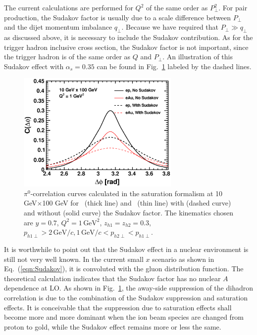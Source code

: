 The current calculations are performed for $Q^2$ of the same order as
$P^2_{\perp}$. For pair production, the Sudakov factor is usually due to
a scale difference between $P_{\perp}$ and the dijet momentum imbalance $q_{\perp}$.
Because we have required that $P_{\perp}\gg q_{\perp}$ as discussed above, it is
necessary to include the Sudakov contribution.  As for the trigger hadron
inclusive cross section, the Sudakov factor is not important, since the trigger
hadron \pt is of the same order as $Q$ and $P_\perp$. An illustration of
this Sudakov effect with $\alpha_s=0.35$ can be found in
Fig.~\ref{fig:dihadron_theory_sud} labeled by the dashed lines.
\begin{figure}
\centering
\includegraphics[width=0.7\textwidth]{plots/chpt6/theory_10x100_y_0.7_deltaphi_Sud_as_0.35.eps} 
\caption[theory prediction of dihadron correlation with Sudakov] {
$\pi^0$-correlation curves calculated in the saturation formalism at 10
GeV$\times $100 GeV for \ep\ (thick line) and \eAu\ (thin line) with (dashed
curve) and without (solid curve) the Sudakov factor. The kinematics chosen are
$y=0.7$, $Q^2=1 \, \textrm{GeV}^2$, $z_{h1}=z_{h2}=0.3$, $p_{h1\perp}>2 \,
\mathrm{GeV}/c,1 \, \mathrm{GeV}/c<p_{h2\perp}<p_{h1\perp}$.
\label{fig:dihadron_theory_sud}
}    
\end{figure}
It is worthwhile to point out that the Sudakov effect in a nuclear environment
is still not very well known. In the current small $x$ scenario as shown in
Eq.~(\ref{eqn:Sudakov}), it is convoluted with the gluon distribution function.
The theoretical calculation indicates that the Sudakov factor has no nuclear
$A$ dependence at LO. As shown in Fig.~\ref{fig:dihadron_theory_sud}, the away-side 
suppression of the dihadron correlation is due to the combination of the
Sudakov suppression and saturation effects. It is conceivable that the
suppression due to saturation effects shall become more and more dominant when
the ion beam species are changed from proton to gold, while the Sudakov effect
remains more or less the same. 

